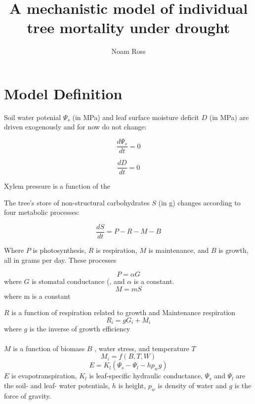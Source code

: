 \documentclass[12pt]{amsart}
\title{A mechanistic model of individual tree mortality under drought}
\author{Noam Ross}
\begin{document}
\maketitle

\section{Model Definition}

Soil water potenial $\Psi_s$ (in MPa) and leaf surface moisture deficit $D$ (in MPa) are driven exogenously and for now do not change:

\begin{equation}\label{Psi_s}
\frac{d\Psi_s}{dt} = 0
\end{equation}

\begin{equation}\label{sD}
\frac{dD}{dt} = 0
\end{equation}

Xylem pressure is a function of the 

The tree's store of non-structural carbohydrates $S$ (in g) changes according to four metabolic processes:

\begin{equation}\label{dS}
\frac{dS}{dt} = P - R - M - B
\end{equation}

Where $P$ is photosynthesis, $R$ is respiration, $M$ is maintenance, and $B$ is growth, all in grams per day.  These processes

\begin{equation}\label{P}
P = \alpha G
\end{equation}
where $G$ is stomatal conductance (, and $\alpha$ is a constant.
\begin{equation}\label{M}
M = mS
  \end{equation}
where m is a constant
\begin{equation}

  \end{equation}
\begin{equation}
  \end{equation}





$R$ is a function of respiration related to growth and Maintenance respiration
\begin{equation}\label{E:Respiration}
R_i = g G_i + M_i
\end{equation}
where $g$ is the inverse of growth efficiency
\\
\\
$M$ is a function of biomass $B$ , water stress, and temperature $T$
\begin{equation}\label{E:Maintenance}
M_i = f(B, T, W)
\end{equation}
\begin{equation}\label{E:Plantwater}
E = K_l (\Psi_s - \Psi_l - h p_w g)
\end{equation}
$E$ is evapotranspiration, $K_l$ is leaf-specific hydraulic conductance, $\Psi_s$ and $\Psi_l$ are the soil- and leaf- water potentials, $h$ is height, $p_w$ is density of water and $g$ is the force of gravity.
\end{document}
